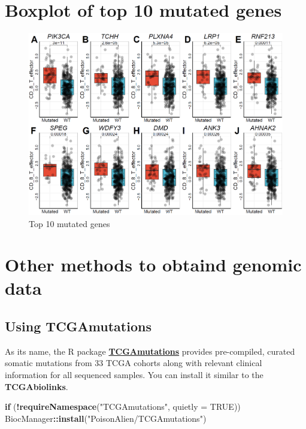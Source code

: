 \documentclass[
  12pt,
]{book}
\newenvironment{Shaded}{\begin{snugshade}}{\end{snugshade}}
\newcommand{\AttributeTok}[1]{\textcolor[rgb]{0.13,0.29,0.53}{#1}}
\newcommand{\ConstantTok}[1]{\textcolor[rgb]{0.56,0.35,0.01}{#1}}
\newcommand{\ControlFlowTok}[1]{\textcolor[rgb]{0.13,0.29,0.53}{\textbf{#1}}}
\newcommand{\FunctionTok}[1]{\textcolor[rgb]{0.13,0.29,0.53}{\textbf{#1}}}
\newcommand{\NormalTok}[1]{#1}
\newcommand{\SpecialCharTok}[1]{\textcolor[rgb]{0.81,0.36,0.00}{\textbf{#1}}}
\newcommand{\StringTok}[1]{\textcolor[rgb]{0.31,0.60,0.02}{#1}}
\begin{document}
\hypertarget{boxplot-of-top-10-mutated-genes}{%
\section{Boxplot of top 10 mutated genes}\label{boxplot-of-top-10-mutated-genes}}

\begin{figure}

{\centering \includegraphics[width=0.95\linewidth]{./fig/4-Relevant_mutations_binary} 

}

\caption{Top 10 mutated genes}\label{fig:unnamed-chunk-7}
\end{figure}

\hypertarget{other-methods-to-obtaind-genomic-data}{%
\section{Other methods to obtaind genomic data}\label{other-methods-to-obtaind-genomic-data}}

\hypertarget{using-tcgamutations}{%
\subsection{Using TCGAmutations}\label{using-tcgamutations}}

As its name, the R package \textbf{\href{https://github.com/PoisonAlien/TCGAmutations}{TCGAmutations}} provides pre-compiled, curated somatic mutations from 33 TCGA cohorts along with relevant clinical information for all sequenced samples. You can install it similar to the \textbf{TCGAbiolinks}.

\begin{Shaded}
\begin{Highlighting}[]
\ControlFlowTok{if}\NormalTok{ (}\SpecialCharTok{!}\FunctionTok{requireNamespace}\NormalTok{(}\StringTok{"TCGAmutations"}\NormalTok{, }\AttributeTok{quietly =} \ConstantTok{TRUE}\NormalTok{))}
\NormalTok{  BiocManager}\SpecialCharTok{::}\FunctionTok{install}\NormalTok{(}\StringTok{"PoisonAlien/TCGAmutations"}\NormalTok{)}
\end{Highlighting}
\end{Shaded}
\end{document}
